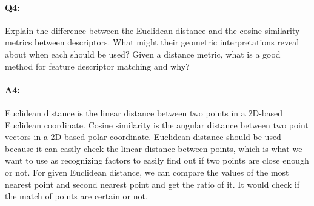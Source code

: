

\pagebreak
\paragraph{Q4:} Explain the difference between the Euclidean distance and the cosine similarity metrics between descriptors. What might their geometric interpretations reveal about when each should be used? Given a distance metric, what is a good method for feature descriptor matching and why?

\paragraph{A4:} Euclidean distance is the linear distance between two points in a 2D-based Euclidean coordinate. Cosine similarity is the angular distance between two point vectors in a 2D-based polar coordinate. Euclidean distance should be used because it can easily check the linear distance between points, which is what we want to use as recognizing factors to easily find out if two points are close enough or not. For given Euclidean distance, we can compare the values of the most nearest point and second nearest point and get the ratio of it. It would check if the match of points are certain or not.









